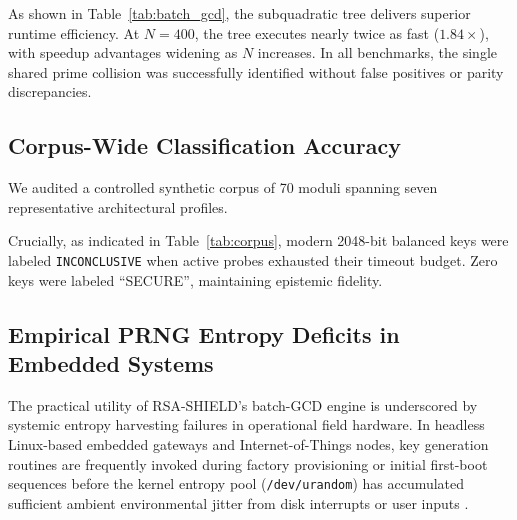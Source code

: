 \documentclass[sigconf,nonacm]{acmart}
\begin{document}
As shown in Table~\ref{tab:batch_gcd}, the subquadratic tree delivers superior runtime efficiency. At $N = 400$, the tree executes nearly twice as fast ($1.84\times$), with speedup advantages widening as $N$ increases. In all benchmarks, the single shared prime collision was successfully identified without false positives or parity discrepancies.

\subsection{Corpus-Wide Classification Accuracy}
We audited a controlled synthetic corpus of 70 moduli spanning seven representative architectural profiles.

\begin{table}[htbp]
\caption{Classification Performance across Synthetic Key Profiles}
\label{tab:corpus}
\centering
{}
\end{table}

Crucially, as indicated in Table~\ref{tab:corpus}, modern 2048-bit balanced keys were labeled \texttt{INCONCLUSIVE} when active probes exhausted their timeout budget. Zero keys were labeled ``SECURE'', maintaining epistemic fidelity.

\subsection{Empirical PRNG Entropy Deficits in Embedded Systems}
The practical utility of RSA-SHIELD's batch-GCD engine is underscored by systemic entropy harvesting failures in operational field hardware. In headless Linux-based embedded gateways and Internet-of-Things nodes, key generation routines are frequently invoked during factory provisioning or initial first-boot sequences before the kernel entropy pool (\texttt{/dev/urandom}) has accumulated sufficient ambient environmental jitter from disk interrupts or user inputs \cite{heninger2012mining, hastings2016weak}. 
\end{document}
